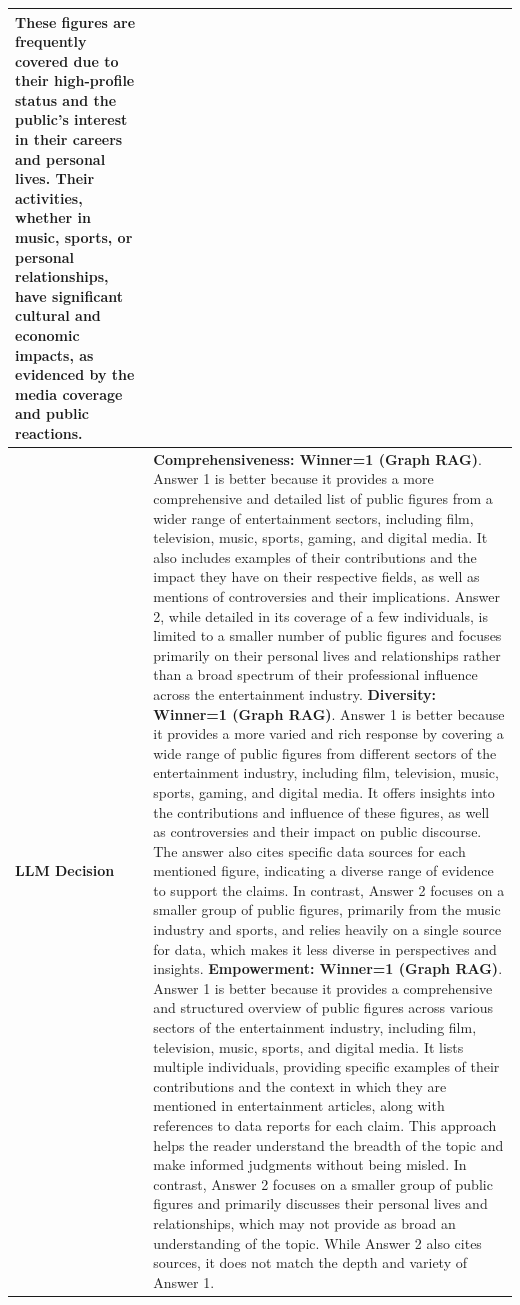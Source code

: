 \documentclass{article}
\begin{document}
\begin{table}[h]
\begin{tabular}{>{\raggedright\arraybackslash}p{}>{\raggedright\arraybackslash}p{}}
These figures are frequently covered due to their high-profile status and the public's interest in their careers and personal lives. Their activities, whether in music, sports, or personal relationships, have significant cultural and economic impacts, as evidenced by the media coverage and public reactions.
\vspace*{2mm}\\ \hline 
\textbf{LLM \break Decision} & \textbf{Comprehensiveness: Winner=1 (Graph RAG)}. Answer 1 is better because it provides a more comprehensive and detailed list of public figures from a wider range of entertainment sectors, including film, television, music, sports, gaming, and digital media. It also includes examples of their contributions and the impact they have on their respective fields, as well as mentions of controversies and their implications. Answer 2, while detailed in its coverage of a few individuals, is limited to a smaller number of public figures and focuses primarily on their personal lives and relationships rather than a broad spectrum of their professional influence across the entertainment industry.
\vspace*{2mm}
\newline
\textbf{Diversity: Winner=1 (Graph RAG)}. Answer 1 is better because it provides a more varied and rich response by covering a wide range of public figures from different sectors of the entertainment industry, including film, television, music, sports, gaming, and digital media. It offers insights into the contributions and influence of these figures, as well as controversies and their impact on public discourse. The answer also cites specific data sources for each mentioned figure, indicating a diverse range of evidence to support the claims. In contrast, Answer 2 focuses on a smaller group of public figures, primarily from the music industry and sports, and relies heavily on a single source for data, which makes it less diverse in perspectives and insights.
\vspace*{2mm}
\newline
\textbf{Empowerment: Winner=1 (Graph RAG)}. Answer 1 is better because it provides a comprehensive and structured overview of public figures across various sectors of the entertainment industry, including film, television, music, sports, and digital media. It lists multiple individuals, providing specific examples of their contributions and the context in which they are mentioned in entertainment articles, along with references to data reports for each claim. This approach helps the reader understand the breadth of the topic and make informed judgments without being misled. In contrast, Answer 2 focuses on a smaller group of public figures and primarily discusses their personal lives and relationships, which may not provide as broad an understanding of the topic. While Answer 2 also cites sources, it does not match the depth and variety of Answer 1.

\end{tabular}
\end{table}
\end{document}
